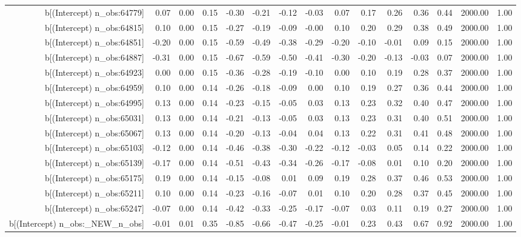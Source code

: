 \begin{table}[ht]
\begin{tabular}{rrrrrrrrrrrrrrr}
  b[(Intercept) n\_obs:64779] & 0.07 & 0.00 & 0.15 & -0.30 & -0.21 & -0.12 & -0.03 & 0.07 & 0.17 & 0.26 & 0.36 & 0.44 & 2000.00 & 1.00 \\ 
  b[(Intercept) n\_obs:64815] & 0.10 & 0.00 & 0.15 & -0.27 & -0.19 & -0.09 & -0.00 & 0.10 & 0.20 & 0.29 & 0.38 & 0.49 & 2000.00 & 1.00 \\ 
  b[(Intercept) n\_obs:64851] & -0.20 & 0.00 & 0.15 & -0.59 & -0.49 & -0.38 & -0.29 & -0.20 & -0.10 & -0.01 & 0.09 & 0.15 & 2000.00 & 1.00 \\ 
  b[(Intercept) n\_obs:64887] & -0.31 & 0.00 & 0.15 & -0.67 & -0.59 & -0.50 & -0.41 & -0.30 & -0.20 & -0.13 & -0.03 & 0.07 & 2000.00 & 1.00 \\ 
  b[(Intercept) n\_obs:64923] & 0.00 & 0.00 & 0.15 & -0.36 & -0.28 & -0.19 & -0.10 & 0.00 & 0.10 & 0.19 & 0.28 & 0.37 & 2000.00 & 1.00 \\ 
  b[(Intercept) n\_obs:64959] & 0.10 & 0.00 & 0.14 & -0.26 & -0.18 & -0.09 & 0.00 & 0.10 & 0.19 & 0.27 & 0.36 & 0.44 & 2000.00 & 1.00 \\ 
  b[(Intercept) n\_obs:64995] & 0.13 & 0.00 & 0.14 & -0.23 & -0.15 & -0.05 & 0.03 & 0.13 & 0.23 & 0.32 & 0.40 & 0.47 & 2000.00 & 1.00 \\ 
  b[(Intercept) n\_obs:65031] & 0.13 & 0.00 & 0.14 & -0.21 & -0.13 & -0.05 & 0.03 & 0.13 & 0.23 & 0.31 & 0.40 & 0.51 & 2000.00 & 1.00 \\ 
  b[(Intercept) n\_obs:65067] & 0.13 & 0.00 & 0.14 & -0.20 & -0.13 & -0.04 & 0.04 & 0.13 & 0.22 & 0.31 & 0.41 & 0.48 & 2000.00 & 1.00 \\ 
  b[(Intercept) n\_obs:65103] & -0.12 & 0.00 & 0.14 & -0.46 & -0.38 & -0.30 & -0.22 & -0.12 & -0.03 & 0.05 & 0.14 & 0.22 & 2000.00 & 1.00 \\ 
  b[(Intercept) n\_obs:65139] & -0.17 & 0.00 & 0.14 & -0.51 & -0.43 & -0.34 & -0.26 & -0.17 & -0.08 & 0.01 & 0.10 & 0.20 & 2000.00 & 1.00 \\ 
  b[(Intercept) n\_obs:65175] & 0.19 & 0.00 & 0.14 & -0.15 & -0.08 & 0.01 & 0.09 & 0.19 & 0.28 & 0.37 & 0.46 & 0.53 & 2000.00 & 1.00 \\ 
  b[(Intercept) n\_obs:65211] & 0.10 & 0.00 & 0.14 & -0.23 & -0.16 & -0.07 & 0.01 & 0.10 & 0.20 & 0.28 & 0.37 & 0.45 & 2000.00 & 1.00 \\ 
  b[(Intercept) n\_obs:65247] & -0.07 & 0.00 & 0.14 & -0.42 & -0.33 & -0.25 & -0.17 & -0.07 & 0.03 & 0.11 & 0.19 & 0.27 & 2000.00 & 1.00 \\ 
  b[(Intercept) n\_obs:\_NEW\_n\_obs] & -0.01 & 0.01 & 0.35 & -0.85 & -0.66 & -0.47 & -0.25 & -0.01 & 0.23 & 0.43 & 0.67 & 0.92 & 2000.00 & 1.00 \\ 

\end{tabular}
\end{table}
